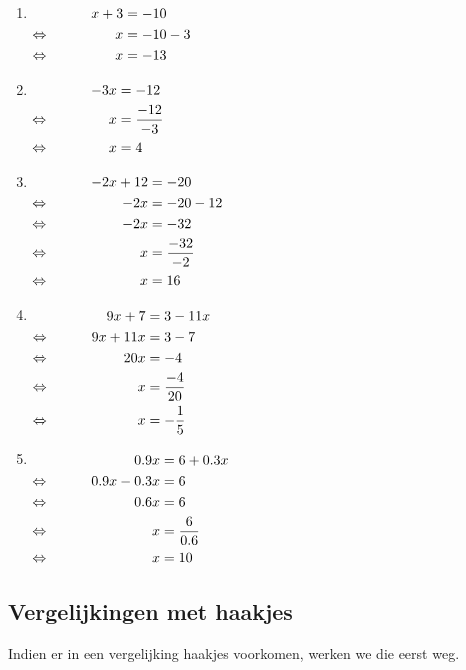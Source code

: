 \documentclass{bis}
\begin{document}
\begin{solution}
\begin{enumerate}
\item $\begin{aligned}[t]
     && x+3 &= -10\\
\Leftrightarrow\mkern40mu &&   x &= -10 -3\\
\Leftrightarrow\mkern40mu &&   x &= -13
\end{aligned}$
\item $\begin{aligned}[t]
     && -3x &= -12\\
\Leftrightarrow\mkern40mu &&   x &= \dfrac{-12}{-3}\\
\Leftrightarrow\mkern40mu &&   x &= 4
\end{aligned}$
\item $\begin{aligned}[t]
     && - 2x + 12	&= - 20\\
\Leftrightarrow\mkern40mu &&      - 2x &= - 20 - 12\\
\Leftrightarrow\mkern40mu &&      - 2x &= - 32\\
\Leftrightarrow\mkern40mu &&        x	&= \dfrac{-32}{-2}\\
\Leftrightarrow\mkern40mu &&        x  &= 16
\end{aligned}$
\item $\begin{aligned}[t]
     && 9x + 7 &= 3 - 11x\\
\Leftrightarrow\mkern40mu && 9x + 11x	&= 3 - 7\\
\Leftrightarrow\mkern40mu && 20x	&= - 4\\
\Leftrightarrow\mkern40mu && x &= \dfrac{-4}{20}\\
\Leftrightarrow\mkern40mu && x &= -\dfrac{1}{5}\\
\end{aligned}$
\item $\begin{aligned}[t]
     && 0.9x	&= 6 + 0.3x \\
\Leftrightarrow\mkern40mu && 0.9x - 0.3x	&= 6\\
\Leftrightarrow\mkern40mu && 0.6x	&= 6\\
\Leftrightarrow\mkern40mu && x	&= \dfrac{6}{0.6} \\
\Leftrightarrow\mkern40mu && x &= 10\\
\end{aligned}$
\end{enumerate}
\end{solution}

\subsection{Vergelijkingen met haakjes}
Indien er in een vergelijking haakjes voorkomen, werken we die eerst weg.
\end{document}
